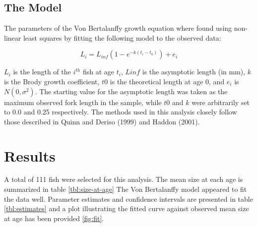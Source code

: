 \documentclass{article}\usepackage[]{graphicx}\usepackage[]{color}
\begin{document}
\subsection*{The Model}
\label{sub:the_model}

The parameters of the Von Bertalanffy growth equation where found using
non-linear least squares by fitting the following model to the
observed data:

\begin{equation}
L_i = L_{inf} (1 - e^{-k(t_i-t_0)}) + e_i
\end{equation}

$L_i$ is the length of the $i^{th}$ fish at age $t_i$, $Linf$ is the
asymptotic length (in mm), $k$ is the Brody growth coefficient, $t0$
is the theoretical length at age 0, and $e_i$  is $N(0,\sigma ^2)$.
The starting value for the asymptotic length was taken as the maximum
observed fork length in the sample, while $t0$ and $k$ were arbitrarily
set to 0.0 and 0.25 respectively.  The methods used in this analysis
closely follow those described in Quinn and Deriso (1999) and Haddon
(2001).

\section*{Results}
\label{sec:results}

A total of 111 fish were selected for this analysis.
The mean size at each age is summarized in table \ref{tbl:size-at-age}
The Von Bertalanffy model appeared to fit the data well.  Parameter
estimates and confidence intervals are presented in table
\ref{tbl:estimates} and a plot illustrating the fitted curve against
observed mean size at age has been provided \ref{fig:fit}.
\end{document}
